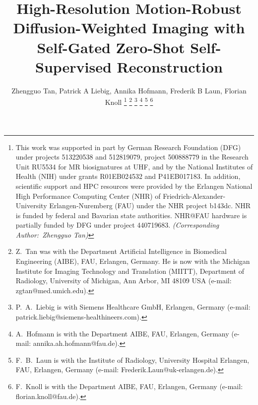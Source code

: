 \documentclass[journal,twoside,web]{ieeecolor}
\begin{document}
	\title{High-Resolution Motion-Robust Diffusion-Weighted Imaging with Self-Gated Zero-Shot Self-Supervised Reconstruction}

	\author{Zhengguo Tan, Patrick A Liebig, Annika Hofmann, Frederik B Laun, Florian Knoll
		\thanks{This work was supported in part by
			German Research Foundation (DFG)
			under projects 513220538 and 512819079,
			project 500888779 in the Research Unit RU5534
			for MR biosignatures at UHF,
			and by the National Institutes of Health (NIH)
			under grants R01EB024532 and P41EB017183.
			In addition, scientific support and HPC resources
			were provided by
			the Erlangen National High Performance Computing Center (NHR)
			of Friedrich-Alexander-University Erlangen-Nuremberg (FAU)
			under the NHR project b143dc.
			NHR is funded by federal and Bavarian state authorities.
			NHR@FAU hardware is partially funded by
			DFG under project 440719683. \textit{(Corresponding Author:~Zhengguo Tan)}}
		\thanks{Z.~Tan was with the Department
			Artificial Intelligence in Biomedical Engineering (AIBE),
			FAU, Erlangen, Germany.
			He is now with
			the Michigan Institute for Imaging Technology and Translation
			(MIITT),
			Department of Radiology,
			University of Michigan, Ann Arbor, MI 48109 USA
			(e-mail: zgtan@med.umich.edu).}
		\thanks{P.~A.~Liebig is with Siemens Healthcare GmbH, Erlangen, Germany
			(e-mail: patrick.liebig@siemens-healthineers.com).}
		\thanks{A.~Hofmann is with the Department AIBE,
			FAU, Erlangen, Germany
			(e-mail: annika.ah.hofmann@fau.de).}
		\thanks{F.~B.~Laun is with the Institute of Radiology,
			University Hospital Erlangen,
			FAU, Erlangen, Germany
			(e-mail: Frederik.Laun@uk-erlangen.de).}
		\thanks{F.~Knoll is with the Department AIBE,
			FAU, Erlangen, Germany
			(e-mail: florian.knoll@fau.de).}
	}

	\maketitle
\end{document}
